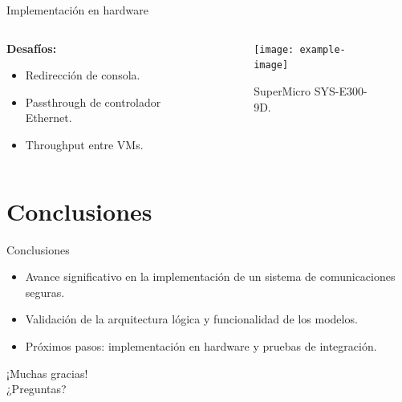 \documentclass[serif, aspectratio=169]{beamer}
\begin{document}
\begin{frame}{Implementación en hardware}
    \begin{columns}
        \begin{column}{0.4\textwidth}
            \textbf{Desafíos:}
            \begin{itemize}
                \item[\space \textcolor{green}{\checkmark}] Redirección de consola.
                \item[{\color{red}\texttimes}] Passthrough de controlador Ethernet.
                \item[{\color{red}\texttimes}] Throughput entre VMs.
            \end{itemize}
        \end{column}

        \begin{column}{0.5\textwidth}
            \begin{figure}
                \centering
                \texttt{[image: example-image]}
                \caption{SuperMicro SYS-E300-9D.} 
            \end{figure}
        \end{column}
    \end{columns}

\end{frame}


\section{Conclusiones}
\begin{frame}{Conclusiones}
    \begin{itemize}
        \item Avance significativo en la implementación de un sistema de comunicaciones seguras.
        \item Validación de la arquitectura lógica y funcionalidad de los modelos.
        \item Próximos pasos: implementación en hardware y pruebas de integración.
    \end{itemize}

\end{frame}

\begin{frame}
    \begin{center}
        \Huge ¡Muchas gracias! \\
        \Huge ¿Preguntas?
    \end{center}
\end{frame}

\end{document}
